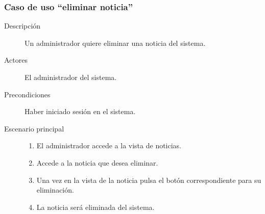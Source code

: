 \subsubsection{Caso de uso ``eliminar noticia''}
\begin{description}
\item[Descripción]  Un administrador quiere eliminar una noticia del sistema.
\item[Actores]  El administrador del sistema.
\item[Precondiciones]  Haber iniciado sesión en el sistema.
\item[Escenario principal]	\hfill
							\begin{enumerate}
							\item El administrador accede a la vista de noticias.
							\item Accede a la noticia que desea eliminar.
							\item Una vez en la vista de la noticia pulsa el botón correspondiente para su eliminación.
							\item La noticia será eliminada del sistema.
							\end{enumerate}
\end{description}
